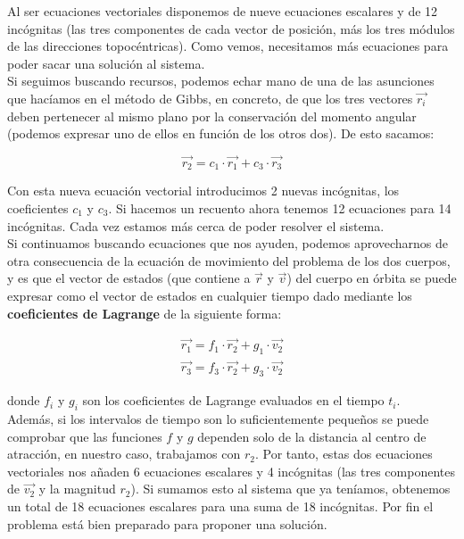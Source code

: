 \documentclass{article}
\numberwithin{equation}{section}
\begin{document}
Al ser ecuaciones vectoriales disponemos de nueve ecuaciones escalares y de 12 incógnitas (las tres componentes de cada vector de posición, más los tres módulos de las direcciones topocéntricas). Como vemos, necesitamos más ecuaciones para poder sacar una solución al sistema.\\

Si seguimos buscando recursos, podemos echar mano de una de las asunciones que hacíamos en el método de Gibbs, en concreto, de que los tres vectores $\overrightarrow{r_i}$ deben pertenecer al mismo plano por la conservación del momento angular (podemos expresar uno de ellos en función de los otros dos). De esto sacamos:

\begin{equation}
    \overrightarrow{r_2} = c_1\cdot\overrightarrow{r_1} + c_3\cdot\overrightarrow{r_3}
\end{equation}

Con esta nueva ecuación vectorial introducimos 2 nuevas incógnitas, los coeficientes $c_1$ y $c_3$. Si hacemos un recuento ahora tenemos 12 ecuaciones para 14 incógnitas. Cada vez estamos más cerca de poder resolver el sistema.\\

Si continuamos buscando ecuaciones que nos ayuden, podemos aprovecharnos de otra consecuencia de la ecuación de movimiento del problema de los dos cuerpos, y es que el vector de estados (que contiene a $\overrightarrow{r}$ y $\overrightarrow{v}$) del cuerpo en órbita se puede expresar como el vector de estados en cualquier tiempo dado mediante los \textbf{coeficientes de Lagrange} de la siguiente forma:

\begin{align}
    \overrightarrow{r_1} = f_1\cdot\overrightarrow{r_2} + g_1\cdot\overrightarrow{v_2} \\
    \overrightarrow{r_3} = f_3\cdot\overrightarrow{r_2} + g_3\cdot\overrightarrow{v_2}
\end{align}

donde $f_i$ y $g_i$ son los coeficientes de Lagrange evaluados en el tiempo $t_i$.\\

Además, si los intervalos de tiempo son lo suficientemente pequeños se puede comprobar que las funciones $f$ y $g$ dependen solo de la distancia al centro de atracción, en nuestro caso, trabajamos con $r_2$. Por tanto, estas dos ecuaciones vectoriales nos añaden 6 ecuaciones escalares y 4 incógnitas (las tres componentes de $\overrightarrow{v_2}$ y la magnitud $r_2$). Si sumamos esto al sistema que ya teníamos, obtenemos un total de 18 ecuaciones escalares para una suma de 18 incógnitas. Por fin el problema está bien preparado para proponer una solución.\\
\end{document}
